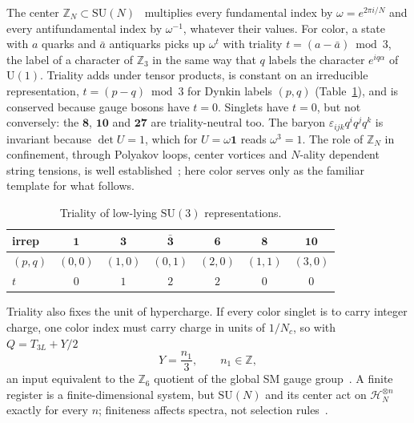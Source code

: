 \documentclass[submission, Phys]{SciPost}
\newcommand{\SU}{\mathrm{SU}}
\newcommand{\U}{\mathrm{U}}
\newcommand{\Z}{\mathbb{Z}}
\newcommand{\one}{\mathbf 1}
\begin{document}
The center $\Z_N\subset\SU(N)$~\cite{georgi1999lie} multiplies every
fundamental index by $\omega=e^{2\pi i/N}$ and every antifundamental
index by $\omega^{-1}$, whatever their values. For color, a state with
$a$ quarks and $\bar a$ antiquarks picks up $\omega^t$ with triality
$t=(a-\bar a)\bmod3$, the label of a character of $\Z_3$ in the same
way that $q$ labels the character $e^{iq\alpha}$ of $\U(1)$. Triality
adds under tensor products, is constant on an irreducible
representation, $t=(p-q)\bmod3$ for Dynkin labels $(p,q)$
(Table~\ref{tab:triality}), and is conserved because gauge bosons have
$t=0$. Singlets have $t=0$, but not conversely: the $\mathbf8$,
$\mathbf{10}$ and $\mathbf{27}$ are triality-neutral too. The baryon
$\varepsilon_{ijk}q^iq^jq^k$ is invariant because $\det U=1$, which for
$U=\omega\one$ reads $\omega^3=1$. The role of $\Z_N$ in confinement,
through Polyakov loops, center vortices and $N$-ality dependent string
tensions, is well established~\cite{THOOFT19781,Polyakov:1978vu,Greensite_2003:PPNP};
here color serves only as the familiar template for what follows.

\begin{table}[t]
\centering
\caption{Triality of low-lying $\SU(3)$ representations.}
\label{tab:triality}
\renewcommand{\arraystretch}{1.2}
\begin{tabular}{lcccccc}
\toprule
irrep & $\mathbf1$ & $\mathbf3$ & $\bar{\mathbf3}$ & $\mathbf6$ & $\mathbf8$ & $\mathbf{10}$ \\
\midrule
$(p,q)$ & $(0,0)$ & $(1,0)$ & $(0,1)$ & $(2,0)$ & $(1,1)$ & $(3,0)$ \\
$t$     & $0$ & $1$ & $2$ & $2$ & $0$ & $0$ \\
\bottomrule
\end{tabular}
\end{table}

Triality also fixes the unit of hypercharge. If every color singlet is
to carry integer charge, one color index must carry charge in units of
$1/N_c$, so with $Q=T_{3L}+Y/2$
\begin{equation}
  Y=\frac{n_1}{3},\qquad n_1\in\Z ,
  \label{eq:Yn1}
\end{equation}
an input equivalent to the $\Z_6$ quotient of the global SM gauge
group~\cite{Tong_2017:JHEP}. A finite register is a finite-dimensional
system, but $\SU(N)$ and its center act on $\mathcal H_N^{\otimes n}$
exactly for every $n$; finiteness affects spectra, not selection
rules~\cite{Pfeuty1970_ANNP}.

\end{document}
